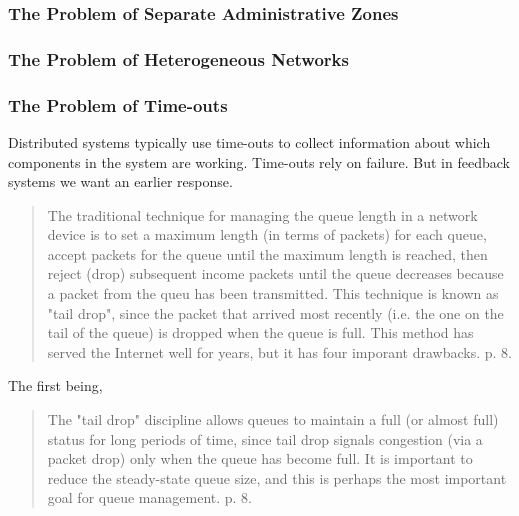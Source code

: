 \subsubsection{The Problem of Separate Administrative Zones}


\subsubsection{The Problem of Heterogeneous Networks}


\subsubsection{The Problem of Time-outs}

Distributed systems typically use time-outs to collect information about which components in the
system are working. Time-outs rely on failure. But in feedback systems we want an earlier response.



\begin{quote}
The traditional technique for managing the queue length in a network device is to set a maximum
    length (in terms of packets) for each queue, accept packets for the queue until the maximum
    length is reached, then reject (drop) subsequent income packets until the queue decreases
    because a packet from the queu has been transmitted. This technique is known as "tail drop",
    since the packet that arrived most recently (i.e. the one on the tail of the queue) is dropped
    when the queue is full. This method has served the Internet well for years, but it has four
    imporant drawbacks. \cite{rfc7567} p. 8.
\end{quote}

The first being,

\begin{quote}
The "tail drop" discipline allows queues to maintain a full (or almost full) status for long periods
of time, since tail drop signals congestion (via a packet drop) only when the queue has become
full. It is important to reduce the steady-state queue size, and this is perhaps the most
important goal for queue management. \cite{rfc7567} p. 8.
\end{quote}


